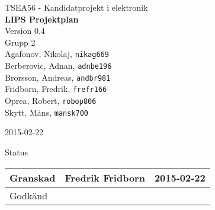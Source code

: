 \documentclass[11pt]{article}
\date{}
\begin{document}
\begin{titlepage}
\begin{center}
TSEA56 - Kandidatprojekt i elektronik \\[0.5in]
{\Large\bfseries LIPS Projektplan}\\
%
\vspace{4\baselineskip}
%
Version 0.4\\
\vspace{2\baselineskip}
%
Grupp 2 \\
Agafonov, Nikolaj, 
\texttt{nikag669}
\\
Berberovic, Adnan, 
\texttt{adnbe196}
\\
Brorsson, Andreas, 
\texttt{andbr981}
\\
Fridborn, Fredrik, 
\texttt{frefr166}
\\
Oprea, Robert, 
\texttt{robop806}
\\
Skytt, Måns, 
\texttt{mansk700}

\vspace{2\baselineskip}
2015-02-22

\vspace{19\baselineskip}
Status
\begin{longtable}{|l|l|l|} \hline

Granskad &
Fredrik Fridborn & 
2015-02-22 \\ \hline
Godkänd &
 &
 \\ \hline
 
\end{longtable}

\end{center}
\end{titlepage}
\end{document}
